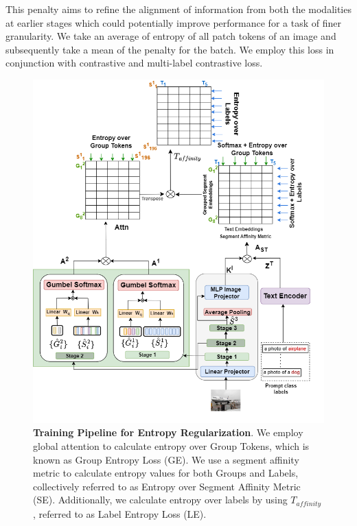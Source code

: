 This penalty aims to refine the alignment of information from both the modalities at earlier stages which could potentially improve performance for a task of finer granularity.
We take an average of entropy of all patch tokens of an image and subsequently take a mean of the penalty for the batch. We employ this loss in conjunction with contrastive and multi-label contrastive loss.

\begin{figure}[t]
  \centering
  \includegraphics[width=1\textwidth]{Images/entropy.drawio (8).drawio (4).png}
  \caption[\textbf{Training Pipeline for Entropy Regularization}]{\textbf{Training Pipeline for Entropy Regularization}. We employ global attention to calculate entropy over Group Tokens, which is known as Group Entropy Loss (GE). We use a segment affinity metric to calculate entropy values for both Groups and Labels, collectively referred to as Entropy over Segment Affinity Metric (SE). Additionally, we calculate entropy over labels by using $T_{affinity}$, referred to as Label Entropy Loss (LE). }
  \label{fig:erfig}
\end{figure}

